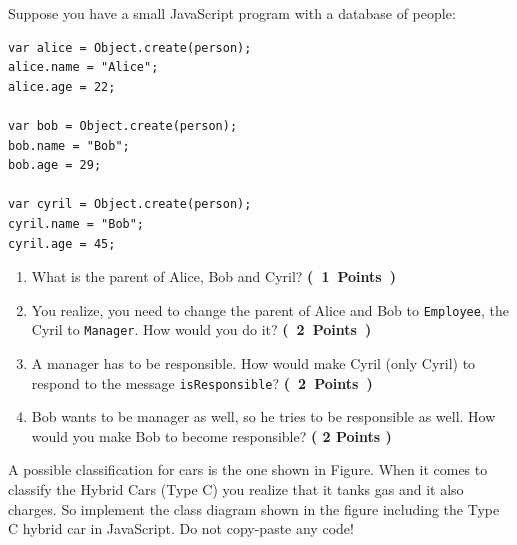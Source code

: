 \documentclass [11pt, a4wide, twoside]{article}
\begin{document}
\noindent Suppose you have a small JavaScript program with a database of people:
\begin{verbatim}
var alice = Object.create(person);
alice.name = "Alice";
alice.age = 22;

var bob = Object.create(person);
bob.name = "Bob";
bob.age = 29;

var cyril = Object.create(person);
cyril.name = "Bob";
cyril.age = 45;
\end{verbatim}


\begin{enumerate}
        \item What is the parent of Alice, Bob and Cyril? \textbf{(~1~Points~)}
        \vspace{5cm}

        \item You realize, you need to change the parent of Alice and Bob to \texttt{Employee}, the Cyril to \texttt{Manager}. How would you do it? \textbf{(~2~Points~)}
        \vspace{5cm}
        \solution{}

        \item A manager has to be responsible. How would make Cyril (only Cyril) to respond to the message \texttt{isResponsible}? \textbf{(~2~Points~)}
        \vspace{5cm}
        \solution{}

        \item Bob wants to be manager as well, so he tries to be responsible as well. How would you make Bob to become responsible? \textbf{( 2 Points )}
        \vspace{5cm}
        \solution{}
\end{enumerate}



\newpage
{}
A possible classification for cars is the one shown in Figure. 
When it comes to classify the Hybrid Cars (Type C) you realize that it tanks gas and it also charges. 
So implement the class diagram shown in the figure including the Type C hybrid car in JavaScript. 
Do not copy-paste any code!
\end{document}
